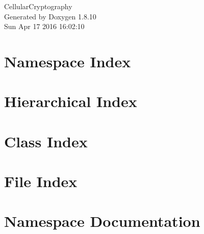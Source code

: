 \documentclass[twoside]{book}
\newcommand{\+}{\discretionary{\mbox{\scriptsize$\hookleftarrow$}}{}{}}
\newcommand{\clearemptydoublepage}{%
  \newpage{\pagestyle{empty}\cleardoublepage}%
}
\begin{document}
\hypersetup{pageanchor=false,
             bookmarks=true,
             bookmarksnumbered=true,
             pdfencoding=unicode
            }
\begin{titlepage}
\vspace*{7cm}
\begin{center}%
{\Large Cellular\+Cryptography }\\
\vspace*{1cm}
{\large Generated by Doxygen 1.8.10}\\
\vspace*{0.5cm}
{\small Sun Apr 17 2016 16:02:10}\\
\end{center}
\end{titlepage}
\clearemptydoublepage
\tableofcontents
\clearemptydoublepage
{}
\hypersetup{pageanchor=true}

\chapter{Namespace Index}

\chapter{Hierarchical Index}

\chapter{Class Index}

\chapter{File Index}

\chapter{Namespace Documentation}






\end{document}
